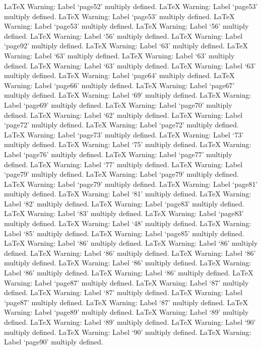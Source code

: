 LaTeX Warning: Label `page52' multiply defined.
LaTeX Warning: Label `page53' multiply defined.
LaTeX Warning: Label `page53' multiply defined.
LaTeX Warning: Label `page53' multiply defined.
LaTeX Warning: Label `56' multiply defined.
LaTeX Warning: Label `56' multiply defined.
LaTeX Warning: Label `page92' multiply defined.
LaTeX Warning: Label `63' multiply defined.
LaTeX Warning: Label `63' multiply defined.
LaTeX Warning: Label `63' multiply defined.
LaTeX Warning: Label `63' multiply defined.
LaTeX Warning: Label `63' multiply defined.
LaTeX Warning: Label `page64' multiply defined.
LaTeX Warning: Label `page66' multiply defined.
LaTeX Warning: Label `page67' multiply defined.
LaTeX Warning: Label `69' multiply defined.
LaTeX Warning: Label `page69' multiply defined.
LaTeX Warning: Label `page70' multiply defined.
LaTeX Warning: Label `62' multiply defined.
LaTeX Warning: Label `page72' multiply defined.
LaTeX Warning: Label `page72' multiply defined.
LaTeX Warning: Label `page73' multiply defined.
LaTeX Warning: Label `73' multiply defined.
LaTeX Warning: Label `75' multiply defined.
LaTeX Warning: Label `page76' multiply defined.
LaTeX Warning: Label `page77' multiply defined.
LaTeX Warning: Label `77' multiply defined.
LaTeX Warning: Label `page79' multiply defined.
LaTeX Warning: Label `page79' multiply defined.
LaTeX Warning: Label `page79' multiply defined.
LaTeX Warning: Label `page81' multiply defined.
LaTeX Warning: Label `81' multiply defined.
LaTeX Warning: Label `82' multiply defined.
LaTeX Warning: Label `page83' multiply defined.
LaTeX Warning: Label `83' multiply defined.
LaTeX Warning: Label `page83' multiply defined.
LaTeX Warning: Label `48' multiply defined.
LaTeX Warning: Label `85' multiply defined.
LaTeX Warning: Label `page85' multiply defined.
LaTeX Warning: Label `86' multiply defined.
LaTeX Warning: Label `86' multiply defined.
LaTeX Warning: Label `86' multiply defined.
LaTeX Warning: Label `86' multiply defined.
LaTeX Warning: Label `86' multiply defined.
LaTeX Warning: Label `86' multiply defined.
LaTeX Warning: Label `86' multiply defined.
LaTeX Warning: Label `page87' multiply defined.
LaTeX Warning: Label `87' multiply defined.
LaTeX Warning: Label `87' multiply defined.
LaTeX Warning: Label `page87' multiply defined.
LaTeX Warning: Label `87' multiply defined.
LaTeX Warning: Label `page89' multiply defined.
LaTeX Warning: Label `89' multiply defined.
LaTeX Warning: Label `89' multiply defined.
LaTeX Warning: Label `90' multiply defined.
LaTeX Warning: Label `90' multiply defined.
LaTeX Warning: Label `page90' multiply defined.
